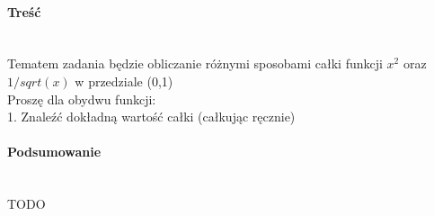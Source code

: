 \paragraph{Treść}~\\
Tematem zadania będzie obliczanie różnymi sposobami całki funkcji $ x^2 $ oraz $ 1/sqrt(x) $ w przedziale (0,1)\\
Proszę dla obydwu funkcji:\\
1. Znaleźć dokładną wartość całki (całkując ręcznie)

\paragraph{Podsumowanie}~\\
TODO
